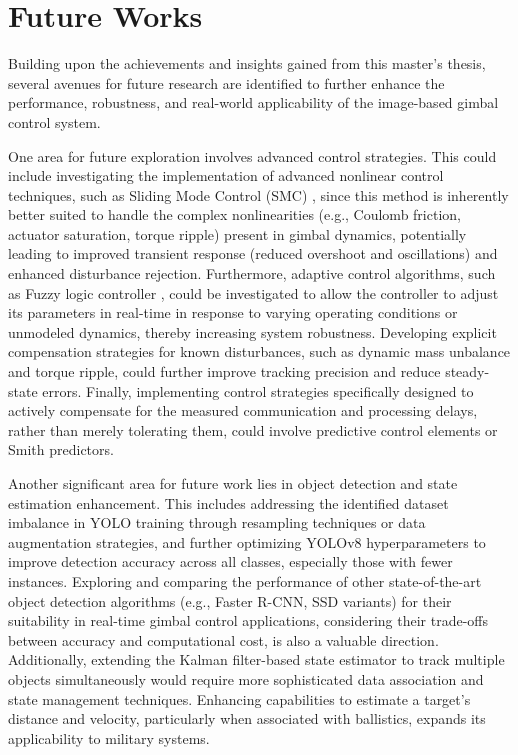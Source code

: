 \section{Future Works}
Building upon the achievements and insights gained from this master's thesis, several avenues for future research are identified to further enhance the performance, robustness, and real-world applicability of the image-based gimbal control system.

One area for future exploration involves advanced control strategies. This could include investigating the implementation of advanced nonlinear control techniques, such as Sliding Mode Control (SMC) \cite{Rahmat2016Sliding}, since this method is inherently better suited to handle the complex nonlinearities (e.g., Coulomb friction, actuator saturation, torque ripple) present in gimbal dynamics, potentially leading to improved transient response (reduced overshoot and oscillations) and enhanced disturbance rejection. Furthermore, adaptive control algorithms, such as Fuzzy logic controller \cite{Galal2009Fuzzy}, could be investigated to allow the controller to adjust its parameters in real-time in response to varying operating conditions or unmodeled dynamics, thereby increasing system robustness. Developing explicit compensation strategies for known disturbances, such as dynamic mass unbalance and torque ripple, could further improve tracking precision and reduce steady-state errors. Finally, implementing control strategies specifically designed to actively compensate for the measured communication and processing delays, rather than merely tolerating them, could involve predictive control elements or Smith predictors.

Another significant area for future work lies in object detection and state estimation enhancement. This includes addressing the identified dataset imbalance in YOLO training through resampling techniques or data augmentation strategies, and further optimizing YOLOv8 hyperparameters to improve detection accuracy across all classes, especially those with fewer instances. Exploring and comparing the performance of other state-of-the-art object detection algorithms (e.g., Faster R-CNN, SSD variants) for their suitability in real-time gimbal control applications, considering their trade-offs between accuracy and computational cost, is also a valuable direction. Additionally, extending the Kalman filter-based state estimator to track multiple objects simultaneously would require more sophisticated data association and state management techniques. Enhancing capabilities to estimate a target's distance and velocity, particularly when associated with ballistics, expands its applicability to military systems.

